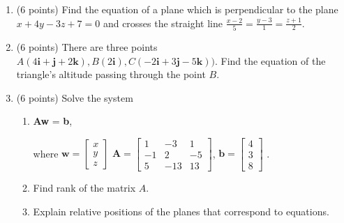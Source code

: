 \documentclass[]{exam}
\begin{document}
\begin{enumerate}

\item (6 points) 
Find the equation of a plane which is perpendicular to the plane  $x + 4y - 3z + 7 = 0$ and crosses the straight line $\frac{x-2}{5} = \frac{y-3}{1} = \frac{z+1}{2}$.





\item (6 points)  
There are three points $A(4\textbf{i} + \textbf{j} + 2\textbf{k}), B(2\textbf{i}), C(-2\textbf{i} + 3\textbf{j} - 5\textbf{k}))$. Find the equation of the triangle's altitude passing through the point $B$.





\item (6 points) Solve the system 
\begin{enumerate}
    \item \textbf{Aw} = \textbf{b}, 
    
    where 
    $\textbf{w} =\begin{bmatrix}
    x \\ y \\ z
    \end{bmatrix}$
    $
\textbf{A}=\begin{bmatrix}
1 & -3 & 1 \\
-1 & 2 & -5 \\
5 & -13 & 13
\end{bmatrix}$, 
$
\textbf{b}=
\begin{bmatrix}
4 \\
3 \\
8
\end{bmatrix}$
.

\item Find rank of the matrix $A$.
\item Explain relative positions of the planes that correspond to equations.
\end{enumerate} 


\end{enumerate}
\end{document}

